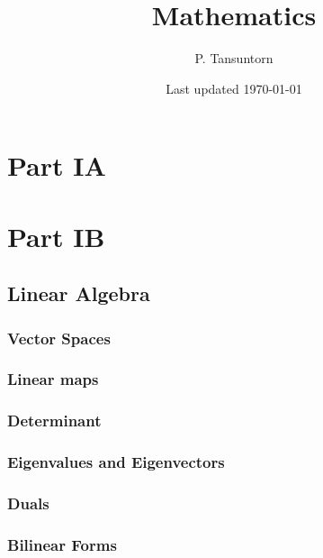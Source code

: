 \documentclass[12pt]{book}
\title{\textbf{Mathematics}}
\author{P. Tansuntorn}
\date{Last updated \today}
\theoremstyle{definition}
\theoremstyle{remark}
\begin{document}
	\frontmatter
	\pagestyle{plain}
	\maketitle
	\tableofcontents
	
	\pagestyle{fancy}
		\fancyhf{}%
		\fancyhead[RO,LE]{\thepage}
		\fancyhead[CO]{\textit{\rightmark}}
		\fancyhead[CE]{\textit{\leftmark}}
		\renewcommand{\headrulewidth}{0pt}
		\renewcommand{\headrulewidth}{0pt}
	
	\mainmatter
	\part{Part IA}
	
	
	
	
	
	
	
	
		
	\part{Part IB}
	\chapter{Linear Algebra}
		\section{Vector Spaces}
		
		\section{Linear maps}
		
		\section{Determinant}
		
		\section{Eigenvalues and Eigenvectors}
		
		\section{Duals}
		
		\section{Bilinear Forms}
		
\end{document}

